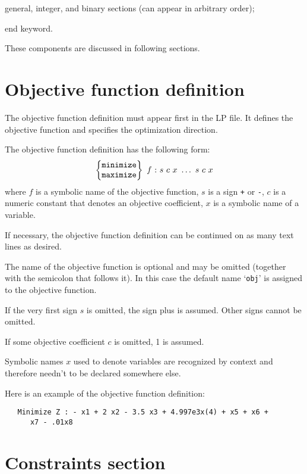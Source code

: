 \Item{---}general, integer, and binary sections (can appear in
arbitrary order);

\Item{---}end keyword.


These components are discussed in following sections.

\section{Objective function definition}

The objective function definition must appear first in the LP file.
It defines the objective function and specifies the optimization
direction.

The objective function definition has the following form:
$$
\left\{
\begin{array}{@{}c@{}}
{\tt minimize} \\ {\tt maximize}
\end{array}
\right\}\ f\ {\tt :}\ s\ c\ x\ \dots\ s\ c\ x
$$
where $f$ is a symbolic name of the objective function, $s$ is a sign
\verb|+| or \verb|-|, $c$ is a numeric constant that denotes an
objective coefficient, $x$ is a symbolic name of a variable.

If necessary, the objective function definition can be continued on as
many text lines as desired.

The name of the objective function is optional and may be omitted
(together with the semicolon that follows it). In this case the default
name `\verb|obj|' is assigned to the objective function.

If the very first sign $s$ is omitted, the sign plus is assumed. Other
signs cannot be omitted.

If some objective coefficient $c$ is omitted, 1 is assumed.

Symbolic names $x$ used to denote variables are recognized by context
and therefore needn't to be declared somewhere else.

Here is an example of the objective function definition:

\begin{verbatim}
   Minimize Z : - x1 + 2 x2 - 3.5 x3 + 4.997e3x(4) + x5 + x6 +
      x7 - .01x8
\end{verbatim}

\section{Constraints section}

